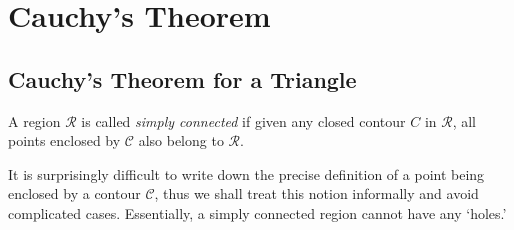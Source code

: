 
\chapter{Cauchy's Theorem}
\section{Cauchy's Theorem for a Triangle}
\begin{definition}
A region $\mathcal{R}$ is called \emph{simply connected} if given any closed contour $C$ in $\mathcal{R}$, all points enclosed by $\mathcal{C}$ also belong to $\mathcal{R}$.
\end{definition}
It is surprisingly difficult to write down the precise definition of a point being enclosed by a contour $\mathcal{C}$, thus we shall treat this notion informally and avoid complicated cases.  Essentially, a simply connected region cannot have any `holes.'

